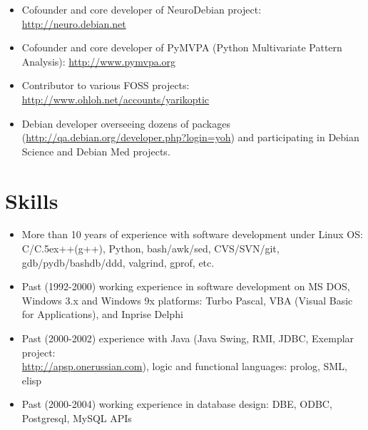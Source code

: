 \documentclass[12pt,overlapped,line]{res}
\def\Cplusplus{{\rm C\raise.5ex\hbox{\small ++}}}
\newcommand{\wdescription}[1]{({\small \textit{#1}})}
\begin{document}
\begin{resume}
\begin{itemize}[parsep=0.2em,leftmargin=1em]
 \item Cofounder and core developer of NeuroDebian project: \url{http://neuro.debian.net}

 \item Cofounder and core developer of PyMVPA (Python Multivariate Pattern Analysis): \url{http://www.pymvpa.org}

 \item Contributor to various FOSS projects: \url{http://www.ohloh.net/accounts/yarikoptic}

 \item Debian developer overseeing dozens of packages
   (\url{http://qa.debian.org/developer.php?login=yoh}) and
   participating in Debian Science and Debian Med projects.

 \end{itemize}

 \section{Skills}
  \begin{description}[parsep=0.2em,leftmargin=1em]

    \item[Programming:]\hspace*{\fill}
      \begin{itemize}
      \item More than 10 years of experience with software development
        under Linux OS: C/\Cplusplus(g++), Python, bash/awk/sed,
        CVS/SVN/git, gdb/pydb/bashdb/ddd, valgrind, gprof, etc.

      \item Past (1992-2000) working experience in software
        development on MS DOS, Windows 3.x and Windows 9x platforms:
        Turbo Pascal, VBA (Visual Basic for Applications), and Inprise
        Delphi

      \item Past (2000-2002) experience with Java (Java Swing, RMI,
        JDBC, Exemplar project:\\ \url{http://apsp.onerussian.com}),
        logic and functional languages: prolog, SML, elisp

      \item Past (2000-2004) working experience in database design:
        DBE, ODBC, Postgresql, MySQL APIs

%
%


\end{itemize}
\end{description}
\end{resume}
\end{document}
